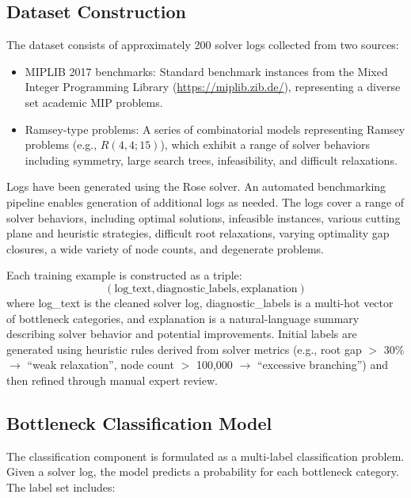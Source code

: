 \documentclass[11pt]{article}
\begin{document}
\subsection{Dataset Construction}
\label{sec:dataset}

The dataset consists of approximately 200 solver logs collected from two sources:
\begin{itemize}
    \item MIPLIB 2017 benchmarks: Standard benchmark instances from the Mixed Integer Programming Library (\url{https://miplib.zib.de/}), 
    representing a diverse set academic MIP problems.
    \item Ramsey-type problems: A series of combinatorial models representing Ramsey problems (e.g., $R(4,4;15)$), which exhibit a 
    range of solver behaviors including symmetry, large search trees, infeasibility, and difficult relaxations.
\end{itemize}

Logs have been generated using the Rose solver. An automated benchmarking pipeline enables generation of additional logs as needed. The logs cover a 
range of solver behaviors, including optimal solutions, infeasible instances, various cutting plane and heuristic strategies, difficult root relaxations, varying 
optimality gap closures, a wide variety of node counts, and degenerate problems.

Each training example is constructed as a triple:
\begin{equation}
    (\text{log\_text}, \text{diagnostic\_labels}, \text{explanation})
\end{equation}
where log\_text is the cleaned solver log, 
diagnostic\_labels is a multi-hot vector of bottleneck categories, and 
explanation is a natural-language summary describing solver behavior and potential improvements. 
Initial labels are generated using heuristic rules derived from solver metrics (e.g., root gap $>$ 30\% $\rightarrow$ ``weak relaxation'', node count $>$ 100{,}000 $\rightarrow$ ``excessive branching'') 
and then refined through manual expert review.

\subsection{Bottleneck Classification Model}

The classification component is formulated as a multi-label classification problem. Given a solver log, the model predicts a probability for each bottleneck category. 
The label set includes:
\end{document}
